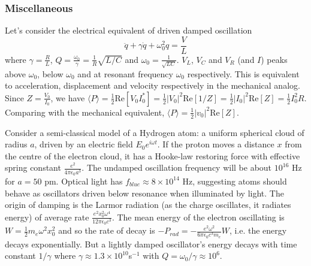 \documentclass[a4paper]{article}
\begin{document}
\subsubsection*{Miscellaneous}
\begin{Note}
Let's consider the electrical equivalent of driven damped oscillation
$$\ddot{q}+\gamma\dot{q}+\omega_0^2q=\frac{V}{L}$$
where $\gamma=\frac{R}{L}$, $Q=\frac{\omega_0}{\gamma}=\frac{1}{R}\sqrt{L/C}$ and $\omega_0=\frac{1}{\sqrt{LC}}$. $V_L$, $V_C$ and $V_R$ (and $I$) peaks above $\omega_0$, below $\omega_0$ and at resonant frequency $\omega_0$ respectively. This is equivalent to acceleration, displacement and velocity respectively in the mechanical analog. Since $Z=\frac{V_0}{I_0}$, we have $\langle P\rangle=\frac{1}{2}\text{Re}[V_0I_0^*]=\frac{1}{2}|V_0|^2\text{Re}[1/Z]=\frac{1}{2}|I_0|^2\text{Re}[Z]=\frac{1}{2}I_0^2R$. Comparing with the mechanical equivalent, $\langle P\rangle=\frac{1}{2}|v_0|^2\text{Re}[Z]$.
\end{Note}
\begin{Note}
Consider a semi-classical model of a Hydrogen atom: a uniform spherical cloud of radius $a$, driven by an electric field $E_0e^{i\omega t}$. If the proton moves a distance $x$ from the centre of the electron cloud, it has a Hooke-law restoring force with effective spring constant $\frac{e^2}{4\pi\epsilon_0a^3}$. The undamped oscillation frequency will be about $10^{16}$ Hz for $a=50$ pm. Optical light has $f_{blue}\approx8\times10^{14}$ Hz, suggesting atoms should behave as oscillators driven below resonance when illuminated by light. The origin of damping is the Larmor radiation (as the charge oscillates, it radiates energy) of average rate $\frac{e^2x_0^2\omega^4}{12\pi\epsilon_0c^3}$. The mean energy of the electron oscillating is $W=\frac{1}{2}m_e\omega^2x_0^2$ and so the rate of decay is $-P_{rad}=-\frac{e^2\omega^2}{6\pi\epsilon_0c^3m_e}W$, i.e. the energy decays exponentially. But a lightly damped oscillator's energy decays with time constant $1/\gamma$ where $\gamma\approx1.3\times10^{10}$s$^{-1}$ with $Q=\omega_0/\gamma\approx10^6$.
\end{Note}
\end{document}
